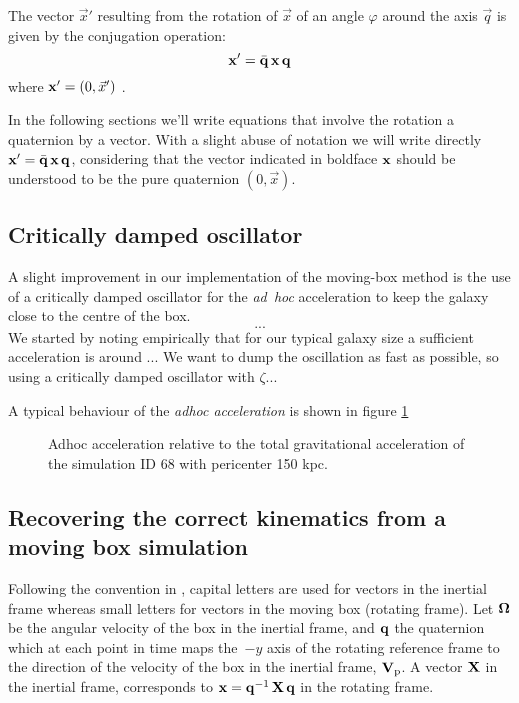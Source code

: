 The vector $\vec x'$ resulting from the rotation of $\vec x$ of an angle $\varphi$ around the axis $\vec q$ is given by the conjugation operation:
\begin{equation}
\boldsymbol{\mathbf{x}}' = \bar{\boldsymbol{\mathbf{q}}}\, \boldsymbol{\mathbf{x}} \, \boldsymbol{\mathbf{q}} 
\end{equation}
where $\boldsymbol{\mathbf{x}}' = (0, \vec x')$ \citep[for a proof, see e.g.][sec. 1.4]{Graf2008}.

In the following sections we'll write equations that involve the rotation a quaternion by a vector.
With a slight abuse of notation we will write directly $\boldsymbol{\mathbf{x}}' = \bar{\boldsymbol{\mathbf{q}}}\, \boldsymbol{\mathbf{x}} \, \boldsymbol{\mathbf{q}}$, considering that the vector indicated in boldface $\boldsymbol{\mathbf{x}}$ should be understood to be the pure quaternion $(0, \vec x)$.%

\subsection{Critically damped oscillator}
A slight improvement in our implementation of the moving-box method is the use of a critically damped oscillator for the \emph{ad~hoc} acceleration to keep the galaxy close to the centre of the box.
\begin{equation}
 ...
\end{equation}
We started by noting empirically that for our typical galaxy size a sufficient acceleration is around ...
We want to dump the oscillation as fast as possible, so using a critically damped oscillator with $\zeta... $

A typical behaviour of the \emph{adhoc acceleration} is shown in figure \ref{fig:adhoc}

\begin{figure}
\centering
\caption{Adhoc acceleration relative to the total gravitational acceleration of the simulation ID 68 with pericenter 150 kpc.}
\label{fig:adhoc}
\end{figure}


\subsection{Recovering the correct kinematics from a moving box simulation}
\label{sec:corret_kinematics}
Following the convention in \citet{Nichols2015}, capital letters are used for vectors in the inertial frame whereas small letters for vectors in the moving box (rotating frame).
Let $\boldsymbol{\mathbf{\Omega}}$ be the angular velocity of the box in the inertial frame, and $\boldsymbol{\mathbf{q}}$ the quaternion which at each point in time maps the~$-y$ axis of the rotating reference frame to the direction of the velocity of the box in the inertial frame, $\mathbf{V}_{\mathrm p}$.
A vector $\boldsymbol{\mathbf{X}}$ in the inertial frame, corresponds to $\boldsymbol{\mathbf{x}} = \mathbf q^{-1}\, \boldsymbol{\mathbf{X}} \,\mathbf q $ in the rotating frame.

